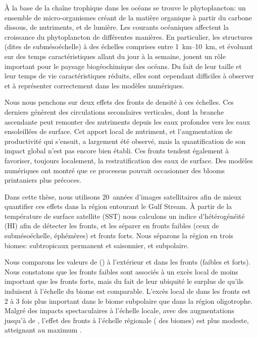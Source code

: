 
\thispagestyle{thesis-empty}

À la base de la chaîne trophique dans les océans se trouve le phytoplancton: un ensemble de micro-organismes créant de la matière organique à partir du carbone dissous, de nutriments, et de lumière.
Les courants océaniques affectent la croissance du phytoplancton de différentes manières.
En particulier, les structures (dites de submésoéchelle) à des échelles comprises entre \qtyrange[range-phrase={ et }]{1}{10}{\km}, et évoluant sur des temps caractéristiques allant du jour à la semaine, jouent un rôle important pour le paysage biogéochimique des océans.
Du fait de leur taille et leur temps de vie caractéristiques réduits, elles sont cependant difficiles à observer  et à représenter correctement dans les modèles numériques.

Nous nous penchons sur deux effets des fronts de densité à ces échelles.
Ces derniers génèrent des circulations secondaires verticales, dont la branche ascendante peut remonter des nutriments depuis les eaux profondes vers les eaux ensoleillées de surface.
Cet apport local de nutriment, et l'augmentation de productivité qui s'ensuit, a largement été observé, mais la quantification de son impact global n'est pas encore bien établi.
Ces fronts tendent également à favoriser, toujours localement, la restratification des eaux de surface.
Des modèles numériques ont montré que ce processus pouvait occasionner des blooms printaniers plus précoces.

Dans cette thèse, nous utilisons 20~années d'images satellitaires afin de mieux quantifier ces effets dans la région entourant le Gulf Stream.
À partir de la température de surface satellite (SST) nous calculons un indice d'hétérogénéité (HI) afin de détecter les fronts, et les séparer en fronts faibles (ceux de submésoéchelle, éphémères) et fronts forts.
Nous séparons la région en trois biomes: subtropicaux permanent et saisonnier, et subpolaire.

Nous comparons les valeurs de  () à l'extérieur et dans les fronts (faibles et forts).
Nous constatons que les fronts faibles sont associés à un excès local de  moins important que les fronts forts, mais du fait de leur ubiquité le surplus de  qu'ils induisent à l'échelle du biome est comparable.
L'excès local de  dans les fronts est 2 à 3 fois plus important dans le biome subpolaire que dans la région oligotrophe.
Malgré des impacts spectaculaires à l'échelle locale, avec des augmentations jusqu'à de , l'effet des fronts à l'échelle régionale ( des biomes) est plus modeste, atteignant au maximum .

